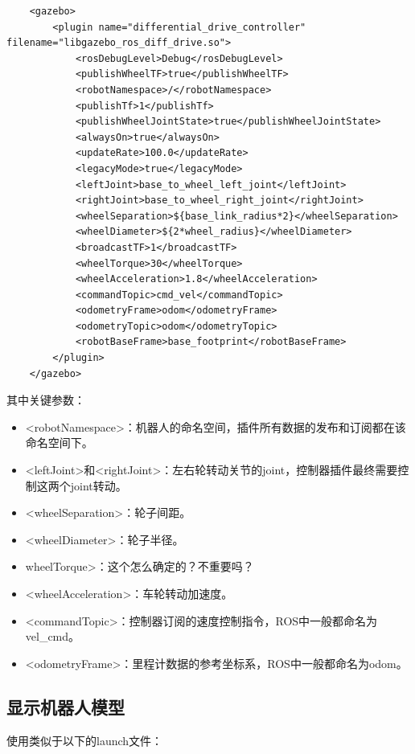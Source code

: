 \documentclass[10pt, oneside]{book}
\begin{document}
\begin{verbatim}
    <gazebo>
        <plugin name="differential_drive_controller" filename="libgazebo_ros_diff_drive.so">
            <rosDebugLevel>Debug</rosDebugLevel>
            <publishWheelTF>true</publishWheelTF>
            <robotNamespace>/</robotNamespace>
            <publishTf>1</publishTf>
            <publishWheelJointState>true</publishWheelJointState>
            <alwaysOn>true</alwaysOn>
            <updateRate>100.0</updateRate>
            <legacyMode>true</legacyMode>
            <leftJoint>base_to_wheel_left_joint</leftJoint>
            <rightJoint>base_to_wheel_right_joint</rightJoint>
            <wheelSeparation>${base_link_radius*2}</wheelSeparation>
            <wheelDiameter>${2*wheel_radius}</wheelDiameter>
            <broadcastTF>1</broadcastTF>
            <wheelTorque>30</wheelTorque>
            <wheelAcceleration>1.8</wheelAcceleration>
            <commandTopic>cmd_vel</commandTopic>
            <odometryFrame>odom</odometryFrame> 
            <odometryTopic>odom</odometryTopic> 
            <robotBaseFrame>base_footprint</robotBaseFrame>
        </plugin>
    </gazebo> 
\end{verbatim}

其中关键参数：
\begin{itemize}
    \item <robotNamespace>：机器人的命名空间，插件所有数据的发布和订阅都在该命名空间下。
    \item <leftJoint>和<rightJoint>：左右轮转动关节的joint，控制器插件最终需要控制这两个joint转动。
    \item <wheelSeparation>：轮子间距。
    \item <wheelDiameter>：轮子半径。
    \item \textcolor[rgb]{1,0,0}{wheelTorque>：这个怎么确定的？不重要吗？} 
    \item <wheelAcceleration>：车轮转动加速度。
    \item <commandTopic>：控制器订阅的速度控制指令，ROS中一般都命名为vel\_cmd。
    \item <odometryFrame>：里程计数据的参考坐标系，ROS中一般都命名为odom。
\end{itemize}

\subsection{显示机器人模型}

使用类似于以下的launch文件：
\end{document}
